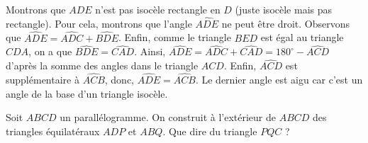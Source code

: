 \begin{sol}
Montrons que $ADE$ n'est pas isocèle rectangle en $D$ (juste isocèle mais pas rectangle). Pour cela, montrons que l'angle $\widehat{ADE}$ ne peut être droit. Observons que $\widehat{ADE}=\widehat{ADC}+\widehat{BDE}$. Enfin, comme le triangle $BED$ est égal au triangle $CDA$, on a que $\widehat{BDE}=\widehat{CAD}$. Ainsi, $\widehat{ADE}=\widehat{ADC}+\widehat{CAD}=180^\circ-\widehat{ACD}$ d'après la somme des angles dans le triangle $ACD$. Enfin, $\widehat{ACD}$ est supplémentaire à $\widehat{ACB}$, donc, $\widehat{ADE}=\widehat{ACB}$. Le dernier angle est aigu car c'est un angle de la base d'un triangle isocèle.
\end{sol}

\begin{exo}
Soit $ABCD$ un parallélogramme. On construit à l'extérieur de $ABCD$
des triangles équilatéraux $ADP$ et $ABQ$. Que dire du triangle
$PQC$ ?
\end{exo}

